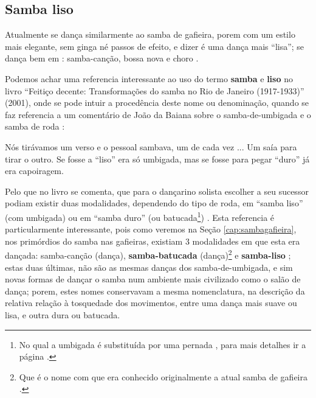 \subsection{Samba liso} 
Atualmente se dança similarmente ao samba de gafieira, 
porem com um estilo mais elegante, sem ginga né passos de efeito, e dizer é uma dança mais ``lisa'';
se dança bem em : samba-canção, bossa nova e choro \cite[pp. 134]{perna2002samba}.~\\


Podemos achar uma referencia interessante ao uso do termo \textbf{samba} e \textbf{liso}  no livro 
``Feitiço decente: Transformações do samba no Rio de Janeiro (1917-1933)'' (2001),
onde se pode intuir a procedência deste nome ou denominação, 
quando se faz referencia a um comentário de João da Baiana sobre o samba-de-umbigada e o samba de roda \cite[pp. 109]{sandroni2001feitico}: 
\begin{citando}
Nós tirávamos um verso e o pessoal sambava, um de cada vez ... 
Um saía para tirar o outro.
Se fosse a ``liso'' era só umbigada, mas se fosse para pegar ``duro'' já era capoiragem. 
\end{citando}
Pelo que no livro se comenta, que para o dançarino solista  escolher a seu sucessor podiam
existir duas modalidades, dependendo do tipo de roda, em ``samba liso'' (com umbigada) ou em ``samba duro'' 
(ou batucada\footnote{No qual a umbigada é substituída por uma pernada \cite[pp. 109]{sandroni2001feitico},
para mais detalhes ir a página \pageref{ref:batuquedanca}.}) \cite[pp. 109]{sandroni2001feitico}.
Esta referencia 
é particularmente interessante, pois como veremos na Seção \ref{cap:sambagafieira},
nos primórdios do samba nas gafieiras, existiam 3 modalidades em que esta era dançada: samba-canção (dança),
\textbf{samba-batucada} (dança)\footnote{Que 
é o nome com que era conhecido originalmente a atual samba de gafieira \cite[pp. 143]{perna2002samba}.} 
e \textbf{samba-liso} \cite[pp. 143]{perna2002samba};
estas duas últimas, não são as mesmas danças dos samba-de-umbigada, 
e sim novas formas de dançar o samba num ambiente mais civilizado como o salão de dança;
porem, estes nomes conservavam a mesma nomenclatura, na descrição 
da relativa relação à tosquedade dos movimentos, entre uma dança mais suave ou lisa, 
e outra dura ou batucada.~\\


